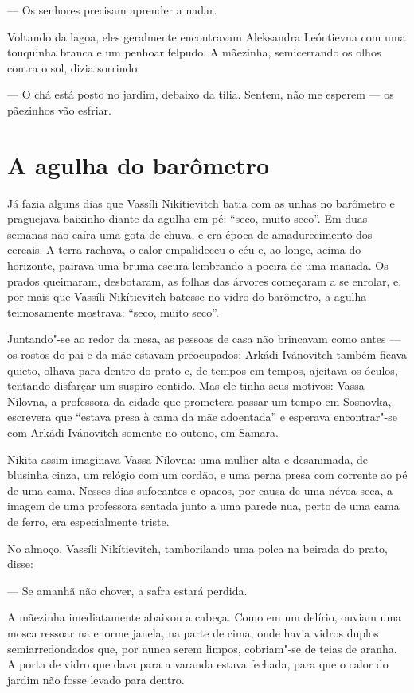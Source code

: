 --- Os senhores precisam aprender a nadar.

Voltando da lagoa, eles geralmente encontravam Aleksandra Leóntievna com
uma touquinha branca e um penhoar felpudo. A mãezinha, semicerrando os
olhos contra o sol, dizia sorrindo:

--- O chá está posto no jardim, debaixo da tília. Sentem, não me esperem
--- os pãezinhos vão esfriar.

\chapter{A agulha do barômetro}

Já fazia alguns dias que Vassíli Nikítievitch batia com as unhas no
barômetro e praguejava baixinho diante da agulha em pé: ``seco, muito
seco''. Em duas semanas não caíra uma gota de chuva, e era época de
amadurecimento dos cereais. A terra rachava, o calor empalideceu o céu
e, ao longe, acima do horizonte, pairava uma bruma escura lembrando a
poeira de uma manada. Os prados queimaram, desbotaram, as folhas das
árvores começaram a se enrolar, e, por mais que Vassíli Nikítievitch
batesse no vidro do barômetro, a agulha teimosamente mostrava: ``seco,
muito seco''.

Juntando"-se ao redor da mesa, as pessoas de casa não brincavam como
antes --- os rostos do pai e da mãe estavam preocupados; Arkádi
Ivánovitch também ficava quieto, olhava para dentro do prato e, de
tempos em tempos, ajeitava os óculos, tentando disfarçar um suspiro
contido. Mas ele tinha seus motivos: Vassa Nílovna, a professora da
cidade que prometera passar um tempo em Sosnovka, escrevera que ``estava
presa à cama da mãe adoentada'' e esperava encontrar"-se com Arkádi
Ivánovitch somente no outono, em Samara.

Nikita assim imaginava Vassa Nílovna: uma mulher alta e desanimada, de
blusinha cinza, um relógio com um cordão, e uma perna presa com corrente
ao pé de uma cama. Nesses dias sufocantes e opacos, por causa de uma
névoa seca, a imagem de uma professora sentada junto a uma parede nua,
perto de uma cama de ferro, era especialmente triste.

No almoço, Vassíli Nikítievitch, tamborilando uma polca na beirada do
prato, disse:

--- Se amanhã não chover, a safra estará perdida.

A mãezinha imediatamente abaixou a cabeça. Como em um delírio, ouviam
uma mosca ressoar na enorme janela, na parte de cima, onde havia vidros
duplos semiarredondados que, por nunca serem limpos, cobriam"-se de teias
de aranha. A porta de vidro que dava para a varanda estava fechada, para
que o calor do jardim não fosse levado para dentro.


